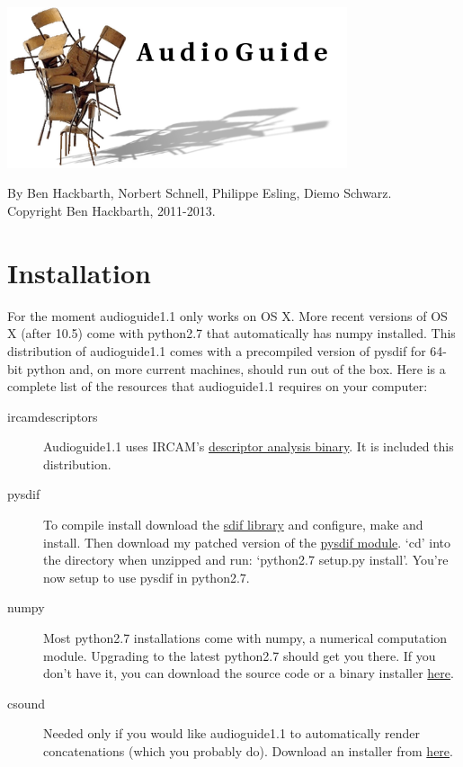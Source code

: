\documentclass{article}
\newcommand{\ag}{audioguide1.1 }
\newcommand{\Ag}{Audioguide1.1 }
\begin{document}
\setlength{\parskip}{10pt}
\begin{spacing}{1.2}
\begin{center}
\includegraphics[width=0.75\textwidth]{image0.png}

By Ben Hackbarth, Norbert Schnell, Philippe Esling, Diemo Schwarz. \\
Copyright Ben Hackbarth, 2011-2013.
\end{center}

\tableofcontents


\section{Installation}
For the moment \ag only works on OS X.  More recent versions of OS X  (after 10.5) come with python2.7 that automatically has numpy installed.  This distribution of \ag comes with a precompiled version of pysdif for 64-bit python and, on more current machines, should run out of the box.  Here is a complete list of the resources that \ag requires on your computer:
\begin{description}
\item[ircamdescriptors] \Ag uses IRCAM's \href{http://www.ircam.fr/1041.html?&L=1}{descriptor analysis binary}.  It is included this distribution.
\item[pysdif] To compile install download the \href{http://sourceforge.net/projects/sdif/files/sdif/}{sdif library} and configure, make and install.  Then download my patched version of the \href{http://www.benhackbarth.com/\ag/pysdif-0.1.4-patch.zip}{pysdif module}.  `cd' into the directory when unzipped and run: `python2.7 setup.py install'.  You're now setup to use pysdif in python2.7.
\item[numpy] Most python2.7 installations come with numpy, a numerical computation module.  Upgrading to the latest python2.7 should get you there.  If you don't have it, you can download the source code or a binary installer \href{http://www.scipy.org/install.html}{here}.
\item[csound] Needed only if you would like \ag to automatically render concatenations (which you probably do).  Download an installer from \href{http://www.csounds.com/downloads}{here}.


\end{description}
\end{spacing}
\end{document}
